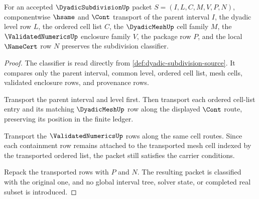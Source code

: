 \begin{theorem}
\label{thm:dyadic-subdivision-cell-ledger-transport}
For an accepted $\DyadicSubdivisionUp$ packet $S=(I,L,C,M,V,P,N)$, componentwise $\hsame$ and $\Cont$ transport of the parent interval $I$, the dyadic level row $L$, the ordered cell list $C$, the $\DyadicMeshUp$ cell family $M$, the $\ValidatedNumericsUp$ enclosure family $V$, the package row $P$, and the local $\NameCert$ row $N$ preserves the subdivision classifier.
\end{theorem}
\begin{proof}
The classifier is read directly from \autoref{def:dyadic-subdivision-source}. It compares only the parent interval, common level, ordered cell list, mesh cells, validated enclosure rows, and provenance rows.

Transport the parent interval and level first. Then transport each ordered cell-list entry and its matching $\DyadicMeshUp$ row along the displayed $\Cont$ route, preserving its position in the finite ledger.

Transport the $\ValidatedNumericsUp$ rows along the same cell routes. Since each containment row remains attached to the transported mesh cell indexed by the transported ordered list, the packet still satisfies the carrier conditions.

Repack the transported rows with $P$ and $N$. The resulting packet is classified with the original one, and no global interval tree, solver state, or completed real subset is introduced.
\end{proof}

